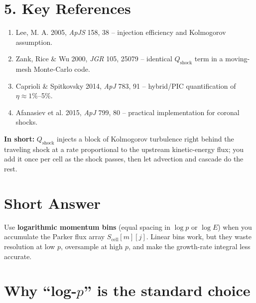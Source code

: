 \section*{5. Key References}

\begin{enumerate}
\item Lee, M. A. 2005, \emph{ApJS} 158, 38 – injection efficiency and Kolmogorov assumption.
\item Zank, Rice \& Wu 2000, \emph{JGR} 105, 25079 – identical $Q_{\text{shock}}$ term in a moving-mesh Monte-Carlo code.
\item Caprioli \& Spitkovsky 2014, \emph{ApJ} 783, 91 – hybrid/PIC quantification of $\eta \approx 1\%$–5\%.
\item Afanasiev et al. 2015, \emph{ApJ} 799, 80 – practical implementation for coronal shocks.
\end{enumerate}

\noindent
\textbf{In short:} $Q_{\text{shock}}$ injects a block of Kolmogorov turbulence right behind the traveling shock at a rate proportional to the upstream kinetic-energy flux; you add it once per cell as the shock passes, then let advection and cascade do the rest.\section*{Short Answer}

Use \textbf{logarithmic momentum bins} (equal spacing in $\log p$ or $\log E$) when you accumulate the Parker flux array $S_{\text{cell}}[m][j]$.
Linear bins work, but they waste resolution at low $p$, oversample at high $p$, and make the growth-rate integral less accurate.

\bigskip

\section*{Why ``log-$p$'' is the standard choice}

